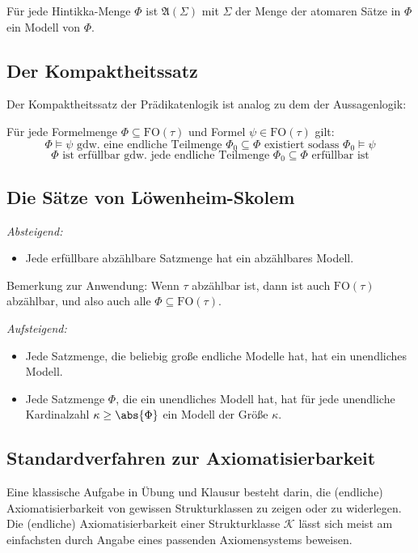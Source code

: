 \documentclass{panikzettel}
\newcommand{\A}{\mathfrak{A}}
\newcommand{\FO}{\mathrm{FO}}
\newcommand{\K}{\mathcal{K}}
\begin{document}
Für jede Hintikka-Menge $\Phi$ ist $\A(\Sigma)$ mit $\Sigma$ der Menge der atomaren Sätze in $\Phi$ ein Modell von $\Phi$.

\subsection{Der Kompaktheitssatz}

Der Kompaktheitssatz der Prädikatenlogik ist analog zu dem der Aussagenlogik:

Für jede Formelmenge $\Phi \subseteq \FO(\tau)$ und Formel $\psi \in \FO(\tau)$ gilt:
\[\Phi \models \psi \text{ gdw.\ eine endliche Teilmenge $\Phi_0 \subseteq \Phi$ existiert sodass } \Phi_0 \models \psi\]
\[\Phi \text{ ist erfüllbar gdw.\ jede endliche Teilmenge $\Phi_0 \subseteq \Phi$ erfüllbar ist}\]

\subsection{Die Sätze von Löwenheim-Skolem}

\emph{Absteigend:}
\begin{itemize}
\item[] Jede erfüllbare abzählbare Satzmenge hat ein abzählbares Modell.
\end{itemize}

Bemerkung zur Anwendung: Wenn $\tau$ abzählbar ist, dann ist auch $\FO(\tau)$ abzählbar, und also auch alle $\Phi\subseteq\FO(\tau)$.

\emph{Aufsteigend:}
\begin{itemize}
\item Jede Satzmenge, die beliebig große endliche Modelle hat, hat ein unendliches Modell.
\item Jede Satzmenge $\Phi$, die ein unendliches Modell hat, hat für jede unendliche Kardinalzahl $\kappa \ge \abs{\Phi}$ ein Modell der Größe $\kappa$.
\end{itemize}

\subsection{Standardverfahren zur Axiomatisierbarkeit}

Eine klassische Aufgabe in Übung und Klausur besteht darin, die (endliche) Axiomatisierbarkeit von gewissen Strukturklassen zu zeigen oder zu widerlegen.
Die (endliche) Axiomatisierbarkeit einer Strukturklasse $\K$ lässt sich meist am einfachsten durch Angabe eines passenden Axiomensystems beweisen.
\end{document}

